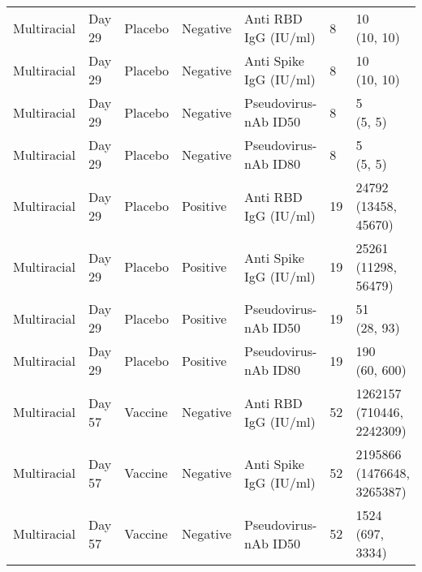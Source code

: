 \documentclass[]{book}
\theoremstyle{definition}
\theoremstyle{definition}
\theoremstyle{definition}
\newcommand{\1}{\mathbbm{1}}
\begin{document}
\begin{landscape}
\begin{ThreePartTable}
\begin{longtable}[t]{>{\raggedright\arraybackslash}p{7cm}llllll}
\hspace{1em}Multiracial & Day 29 & Placebo & Negative & Anti RBD IgG (IU/ml) & 8 & \makecell[l]{10\\(10, 10)}\\
\hspace{1em}Multiracial & Day 29 & Placebo & Negative & Anti Spike IgG (IU/ml) & 8 & \makecell[l]{10\\(10, 10)}\\
\hspace{1em}Multiracial & Day 29 & Placebo & Negative & Pseudovirus-nAb ID50 & 8 & \makecell[l]{5\\(5, 5)}\\
\hspace{1em}Multiracial & Day 29 & Placebo & Negative & Pseudovirus-nAb ID80 & 8 & \makecell[l]{5\\(5, 5)}\\
\hspace{1em}Multiracial & Day 29 & Placebo & Positive & Anti RBD IgG (IU/ml) & 19 & \makecell[l]{24792\\(13458, 45670)}\\
\hspace{1em}Multiracial & Day 29 & Placebo & Positive & Anti Spike IgG (IU/ml) & 19 & \makecell[l]{25261\\(11298, 56479)}\\
\hspace{1em}Multiracial & Day 29 & Placebo & Positive & Pseudovirus-nAb ID50 & 19 & \makecell[l]{51\\(28, 93)}\\
\hspace{1em}Multiracial & Day 29 & Placebo & Positive & Pseudovirus-nAb ID80 & 19 & \makecell[l]{190\\(60, 600)}\\
\hspace{1em}Multiracial & Day 57 & Vaccine & Negative & Anti RBD IgG (IU/ml) & 52 & \makecell[l]{1262157\\(710446, 2242309)}\\
\hspace{1em}Multiracial & Day 57 & Vaccine & Negative & Anti Spike IgG (IU/ml) & 52 & \makecell[l]{2195866\\(1476648, 3265387)}\\
\hspace{1em}Multiracial & Day 57 & Vaccine & Negative & Pseudovirus-nAb ID50 & 52 & \makecell[l]{1524\\(697, 3334)}\\

\end{longtable}
\end{ThreePartTable}
\end{landscape}
\end{document}
